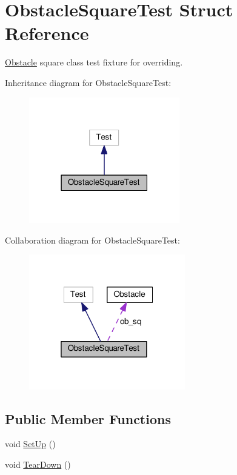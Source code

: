 \hypertarget{structObstacleSquareTest}{}\section{Obstacle\+Square\+Test Struct Reference}
\label{structObstacleSquareTest}


\hyperlink{classObstacle}{Obstacle} square class test fixture for overriding.  




Inheritance diagram for Obstacle\+Square\+Test\+:
\nopagebreak
\begin{figure}[H]
\begin{center}
\leavevmode
\includegraphics[width=186pt]{structObstacleSquareTest__inherit__graph}
\end{center}
\end{figure}


Collaboration diagram for Obstacle\+Square\+Test\+:
\nopagebreak
\begin{figure}[H]
\begin{center}
\leavevmode
\includegraphics[width=193pt]{structObstacleSquareTest__coll__graph}
\end{center}
\end{figure}
\subsection*{Public Member Functions}
\begin{DoxyCompactItemize}
\item 
void \hyperlink{structObstacleSquareTest_a1b4031fb1b71d0b365037a7a0c32c75b}{Set\+Up} ()
\item 
void \hyperlink{structObstacleSquareTest_a45434f333e6c64f5cf9b2aa7814d8022}{Tear\+Down} ()
\end{DoxyCompactItemize}
